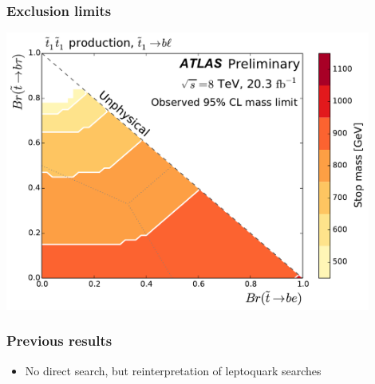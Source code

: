 \documentclass[10pt, svgnames]{beamer}
\begin{document}
\begin{frame}
  \frametitle{Exclusion limits}
  \begin{center}
    \includegraphics[width=0.9\textwidth]
    {figures/blstop/mass_limit_contours_no_extras_obs.pdf}
  \end{center}
\end{frame}


\begin{frame}
  \frametitle{Previous results}
  \begin{itemize}
    \item No direct search, but reinterpretation of leptoquark searches
  \end{itemize}
  \begin{center}
  \end{center}
\end{frame}
\end{document}
